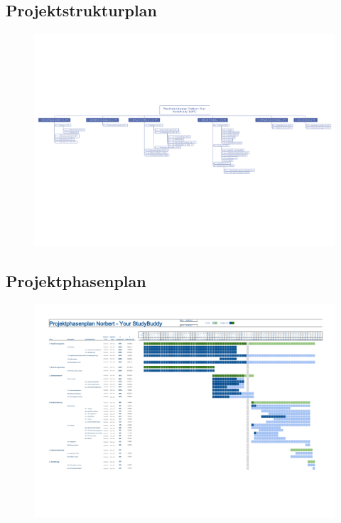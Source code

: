 

\begin{landscape}
\chapter{Projektstrukturplan}
\begin{figure}[H]
\centering
\includegraphics[scale=0.85]{images/plan.pdf}
\end{figure}
\end{landscape}

\begin{landscape}
\chapter{Projektphasenplan}
\begin{figure}[H]
\centering
\includegraphics[scale=0.75]{images/projektphasen.pdf}
\end{figure}
\end{landscape}


